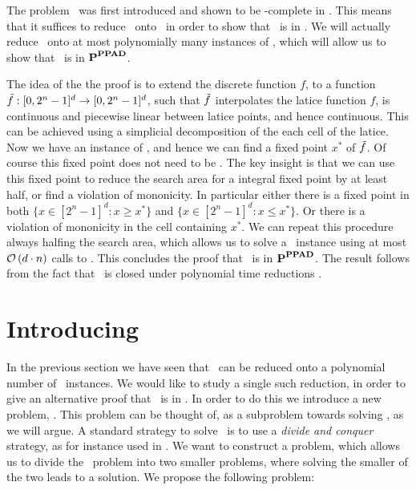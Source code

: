 The problem \Brouwer\ was first introduced and shown to be \PPAD-complete in . This means that it suffices to reduce \Tarski\ onto \Brouwer\ in order to show that \Tarski\ is in \PPAD. We will actually reduce \Tarski\ onto at most polynomially many instances of \Brouwer, which will allow us to show that \Tarski\ is in $\textbf{P}^{\textbf{PPAD}}$.

The idea of the the proof is to extend the discrete function $f$, to a function $\Tilde{f} : [0, 2^n - 1]^d \rightarrow [0, 2^n - 1]^d$, such that $\Tilde{f}$ interpolates the latice function $f$, is continuous and piecewise linear between latice points, and hence continuous. This can be achieved using a simplicial decomposition of the each cell of the latice. Now we have an instance of \Brouwer, and hence we can find a fixed point $x^*$ of $\Tilde{f}$. Of course this fixed point does not need to be 
.
The key insight is that we can use this fixed point to reduce the search area for a integral fixed point by at least half, or find a violation of mononicity. In particular either there is a fixed point in both $\{x \in [2^n-1]^d : x \geq x^*\}$ and $\{x \in [2^n-1]^d : x \leq x^*\}$. Or there is a violation of mononicity in the cell containing $x^*$.
We can repeat this procedure always halfing the search area, which allows us to solve a \Tarski\ instance using at most $\mathcal{O}\left(d \cdot n\right)$ calls to \Brouwer. This concludes the proof that \Tarski\ is in $\textbf{P}^{\textbf{PPAD}}$. The result follows from the fact that \PPAD\ is closed under polynomial time reductions .

\section{Introducing \Tarskistar}

In the previous section we have seen that \Tarski\ can be reduced onto a polynomial number of \Brouwer\ instances. We would like to study a single such reduction, in order to give an alternative proof that \Tarski\ is in \PPAD. In order to do this we introduce a new problem, \Tarskistar. This problem can be thought of, as a subproblem towards solving \Tarski, as we will argue. A standard strategy to solve \Tarski\ is to use a \emph{divide and conquer} strategy, as for instance used in . We want to construct a problem, which allows us to divide the \Tarski\ problem into two smaller problems, where solving the smaller of the two leads to a solution. We propose the following problem:

